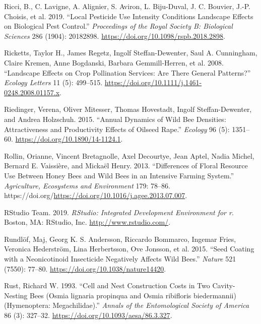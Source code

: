 \documentclass[smallextended]{svjour3}       %
\newlength{\cslhangindent}
\newenvironment{CSLReferences}[2] %
 {%
  \setlength{\parindent}{0pt}
  \ifodd #1 \everypar{\setlength{\hangindent}{\cslhangindent}}\ignorespaces\fi
  \ifnum #2 > 0
  \setlength{\parskip}{#2\baselineskip}
  \fi
 }%
 {}
\begin{document}
\begin{CSLReferences}{1}{0}
\leavevmode{}%
Ricci, B., C. Lavigne, A. Alignier, S. Aviron, L. Biju-Duval, J. C.
Bouvier, J.-P. Choisis, et al. 2019. {``Local Pesticide Use Intensity
Conditions Landscape Effects on Biological Pest Control.''}
\emph{Proceedings of the Royal Society B: Biological Sciences} 286
(1904): 20182898. \url{https://doi.org/10.1098/rspb.2018.2898}.

\leavevmode{}%
Ricketts, Taylor H., James Regetz, Ingolf Steffan-Dewenter, Saul A.
Cunningham, Claire Kremen, Anne Bogdanski, Barbara Gemmill-Herren, et
al. 2008. {``Landscape Effects on Crop Pollination Services: Are There
General Patterns?''} \emph{Ecology Letters} 11 (5): 499--515.
\url{https://doi.org/10.1111/j.1461-0248.2008.01157.x}.

\leavevmode{}%
Riedinger, Verena, Oliver Mitesser, Thomas Hovestadt, Ingolf
Steffan-Dewenter, and Andrea Holzschuh. 2015. {``Annual Dynamics of Wild
Bee Densities: Attractiveness and Productivity Effects of Oilseed
Rape.''} \emph{Ecology} 96 (5): 1351--60.
\url{https://doi.org/10.1890/14-1124.1}.

\leavevmode{}%
Rollin, Orianne, Vincent Bretagnolle, Axel Decourtye, Jean Aptel, Nadia
Michel, Bernard E. Vaissière, and Mickaël Henry. 2013. {``Differences of
Floral Resource Use Between Honey Bees and Wild Bees in an Intensive
Farming System.''} \emph{Agriculture, Ecosystems and Environment} 179:
78--86.
https://doi.org/\url{https://doi.org/10.1016/j.agee.2013.07.007}.

\leavevmode{}%
RStudio Team. 2019. \emph{RStudio: Integrated Development Environment
for r}. Boston, MA: RStudio, Inc. \url{http://www.rstudio.com/}.

\leavevmode{}%
Rundlöf, Maj, Georg K. S. Andersson, Riccardo Bommarco, Ingemar Fries,
Veronica Hederström, Lina Herbertsson, Ove Jonsson, et al. 2015. {``Seed
Coating with a Neonicotinoid Insecticide Negatively Affects Wild
Bees.''} \emph{Nature} 521 (7550): 77--80.
\url{https://doi.org/10.1038/nature14420}.

\leavevmode{}%
Rust, Richard W. 1993. {``{Cell and Nest Construction Costs in Two
Cavity-Nesting Bees (Osmia lignaria propinqua and Osmia ribifloris
biedermannii) (Hymenoptera: Megachilidae)}.''} \emph{Annals of the
Entomological Society of America} 86 (3): 327--32.
\url{https://doi.org/10.1093/aesa/86.3.327}.


\end{CSLReferences}
\end{document}
